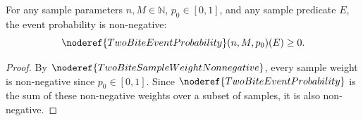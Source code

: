 \begin{helper}
For any sample parameters \(n, M\in\mathbb N\), \(p_0\in[0,1]\), and any sample predicate \(E\), the event probability is non-negative:
\[
\noderef{TwoBiteEventProbability}(n,M,p_0)(E)\ge0.
\]
\end{helper}
\begin{proof}
By \(\noderef{TwoBiteSampleWeightNonnegative}\), every sample weight is non-negative since \(p_0\in[0,1]\). Since \(\noderef{TwoBiteEventProbability}\) is the sum of these non-negative weights over a subset of samples, it is also non-negative.
\end{proof}
